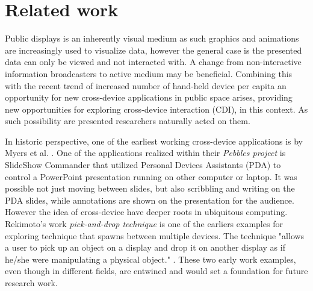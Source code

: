 \section{Related work} \label{sec:relatedwork}

Public displays is an inherently visual medium as such graphics and animations are increasingly used to visualize data, however the general case is the presented data can only be viewed and not interacted with. A change from non-interactive information broadcasters to active medium may be beneficial. 
Combining this with the recent trend of increased number of hand-held device per capita an opportunity for new cross-device applications in public space arises, providing new opportunities for exploring cross-device interaction (CDI), in this context.
As such possibility are presented researchers naturally acted on them.

In historic perspective, one of the earliest working cross-device applications is by Myers et al. \cite{Myers:2001}. 
One of the applications realized within their \emph{Pebbles project} is SlideShow Commander that utilized Personal Devices Assistants (PDA) to control a PowerPoint presentation running on other computer or laptop.
It was possible not just moving between slides, but also scribbling and writing on the PDA slides, while annotations are shown on the presentation for the audience. 
However the idea of cross-device have deeper roots in ubiquitous computing. Rekimoto's work \emph{pick-and-drop technique} is one of the earliers examples for exploring technique that spawns between multiple devices. The technique "allows a user to pick up an object on a display and drop it on another display as if he/she were manipulating a physical object." \cite{Rekimoto:1997}. 
These two early work examples, even though in different fields, are entwined and would set a foundation for future research work.\\


